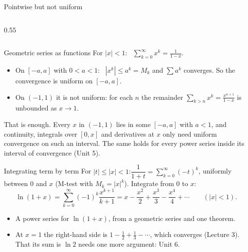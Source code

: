 \documentclass{wosm-slides}
\begin{document}
\begin{frame}{Pointwise but not uniform}
\begin{columns}[c]
\begin{column}{0.55\textwidth}
    \end{column}
  \end{columns}
\end{frame}

\begin{frame}{Geometric series as functions}
  For $|x| < 1$: \ $\displaystyle\sum_{k=0}^\infty x^k = \frac{1}{1-x}$.
  \begin{itemize}
    \item On $[-a, a]$ with $0 < a < 1$: \ $|x^k| \le a^k = M_k$ and $\sum a^k$ converges.
      So the convergence is uniform on $[-a, a]$.
    \item On $(-1, 1)$ it is not uniform: for each $n$ the remainder
      $\sum_{k > n} x^k = \frac{x^{n+1}}{1-x}$ is unbounded as $x \to 1$.
  \end{itemize}
  \pause
  \begin{remark}
    That is enough. Every $x$ in $(-1, 1)$ lies in some $[-a, a]$ with $a < 1$, and continuity,
    integrals over $[0, x]$ and derivatives at $x$ only need uniform convergence on such an
    interval. The same holds for every power series inside its interval of convergence (Unit 5).
  \end{remark}
\end{frame}

\begin{frame}{Integrating term by term}
  For $|t| \le |x| < 1$:\quad $\dfrac{1}{1+t} = \sum_{k=0}^\infty (-t)^k$, uniformly
  between $0$ and $x$ (M-test with $M_k = |x|^k$). Integrate from $0$ to $x$:
  \[ \ln(1 + x) = \sum_{k=0}^\infty (-1)^k \frac{x^{k+1}}{k+1}
     = x - \frac{x^2}{2} + \frac{x^3}{3} - \frac{x^4}{4} + \cdots \qquad (|x| < 1) . \]
  \pause
  \begin{itemize}
    \item A power series for $\ln(1 + x)$, from a geometric series and one theorem.
    \item At $x = 1$ the right-hand side is $1 - \frac12 + \frac13 - \cdots$, which converges
      (Lecture 3). That its sum is $\ln 2$ needs one more argument: Unit 6.
  \end{itemize}
\end{frame}
\end{document}
